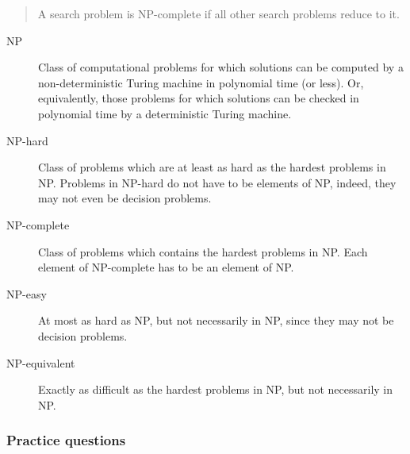 \documentclass[a4paper,11pt]{article}
\begin{document}
\begin{quote}
A search problem is NP-complete if all other search problems reduce to
it.
\end{quote}

\begin{description}
\item[NP]
Class of computational problems for which solutions can be computed by a
non-deterministic Turing machine in polynomial time (or less). Or,
equivalently, those problems for which solutions can be checked in
polynomial time by a deterministic Turing machine.
\item[NP-hard]
Class of problems which are at least as hard as the hardest problems in
NP. Problems in NP-hard do not have to be elements of NP, indeed, they
may not even be decision problems.
\item[NP-complete]
Class of problems which contains the hardest problems in NP. Each
element of NP-complete has to be an element of NP.
\item[NP-easy]
At most as hard as NP, but not necessarily in NP, since they may not be
decision problems.
\item[NP-equivalent]
Exactly as difficult as the hardest problems in NP, but not necessarily
in NP.
\end{description}

\subsubsection{Practice questions}\label{practice-questions-20}
\end{document}
